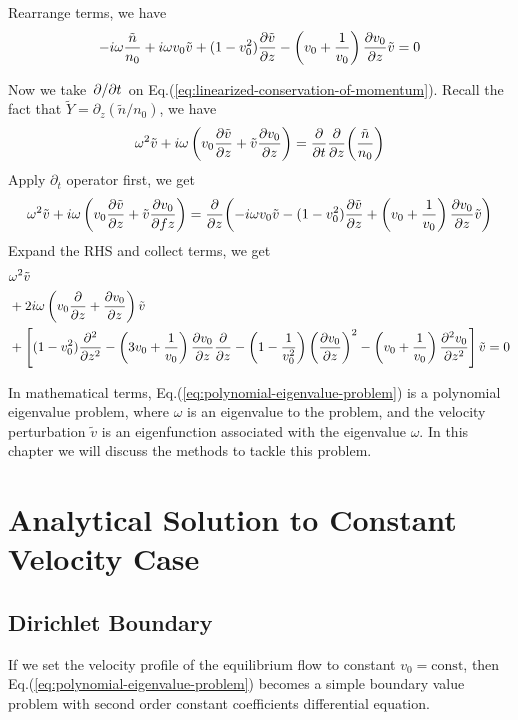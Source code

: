 Rearrange terms, we have
\[
    -i\omega\frac{\tilde{n}}{n_0}
    + i\omega v_0\tilde{v}
    + (1-v_0^2)\pdv{\tilde{v}}{z}
    - \left(v_0+\frac{1}{v_0}\right)\pdv{v_0}{z}\tilde{v} = 0
\]

Now we take $\pdv*{t}$ on Eq.(\ref{eq:linearized-conservation-of-momentum}). Recall the fact that $\tilde{Y} = \partial_z(\tilde{n}/n_0)$, we have
\[
    \omega^2\tilde{v} + i\omega\left(v_0\pdv{\tilde{v}}{z} + \tilde{v}\pdv{v_0}{z}\right)
    = \pdv{t}\pdv{z}(\frac{\tilde{n}}{n_0})
\]
Apply $\partial_t$ operator first, we get
\[
    \omega^2\tilde{v} + i\omega\left(v_0\pdv{\tilde{v}}{z} + \tilde{v}\pdv{v_0}{fz}\right)
    = \pdv{z}(-i\omega v_0\tilde{v}
    - (1-v_0^2)\pdv{\tilde{v}}{z}
    + \left(v_0+\frac{1}{v_0}\right)\pdv{v_0}{z}\tilde{v})
\]
Expand the RHS and collect terms, we get
\begin{equation} \label{eq:polynomial-eigenvalue-problem}
    \begin{aligned}
         & \omega^2 \tilde{v}                                          \\
         & +2i\omega\left(v_0\pdv{}{z} + \pdv{v_0}{z}\right) \tilde{v} \\
         & +\left[ (1-v_0^2)\pdv[2]{}{z}
            -\left(3v_0 + \frac{1}{v_0}\right)\pdv{v_0}{z}\pdv{}{z}
            - \left(1-\frac{1}{v_0^2}\right)\left(\pdv{v_0}{z}\right)^2
            - \left(v_0+\frac{1}{v_0}\right)\pdv[2]{v_0}{z} \right]\tilde{v}
        = 0
    \end{aligned}
\end{equation}

In mathematical terms, Eq.(\ref{eq:polynomial-eigenvalue-problem}) is a polynomial eigenvalue problem, where $\omega$ is an eigenvalue to the problem, and the velocity perturbation $\tilde{v}$ is an eigenfunction associated with the eigenvalue $\omega$. In this chapter we will discuss the methods to tackle this problem.

\section{Analytical Solution to Constant Velocity Case}
\subsection{Dirichlet Boundary}
If we set the velocity profile of the equilibrium flow to constant $v_0=\text{const}$, then Eq.(\ref{eq:polynomial-eigenvalue-problem}) becomes a simple boundary value problem with second order constant coefficients differential equation.

